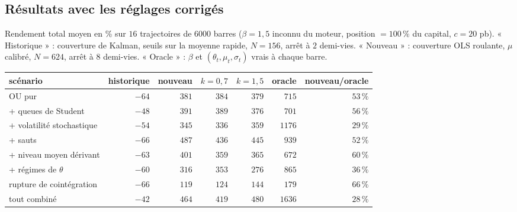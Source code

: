 \documentclass[11pt,a4paper]{article}
\theoremstyle{definition}
\theoremstyle{remark}
\begin{document}
\subsection{Résultats avec les réglages corrigés}

Rendement total moyen en \% sur $16$ trajectoires de $6000$ barres ($\beta=1{,}5$ inconnu du moteur, position $=100\,\%$ du capital, $c=20$ pb).
« Historique » : couverture de Kalman, seuils sur la moyenne rapide, $N=156$, arrêt à $2$ demi-vies. « Nouveau » : couverture OLS roulante, $\mu$ calibré, $N=624$, arrêt à $8$ demi-vies.
« Oracle » : $\beta$ et $(\theta_t,\mu_t,\sigma_t)$ vrais à chaque barre.

\begin{center}
\small
\begin{tabular}{lrrrrrr}
\toprule
scénario & historique & nouveau & $k=0{,}7$ & $k=1{,}5$ & oracle & nouveau/oracle\\
\midrule
OU pur & $-64$ & $381$ & $384$ & $379$ & $715$ & $53\,\%$\\
+ queues de Student & $-48$ & $391$ & $389$ & $376$ & $701$ & $56\,\%$\\
+ volatilité stochastique & $-54$ & $345$ & $336$ & $359$ & $1176$ & $29\,\%$\\
+ sauts & $-66$ & $487$ & $436$ & $445$ & $939$ & $52\,\%$\\
+ niveau moyen dérivant & $-63$ & $401$ & $359$ & $365$ & $672$ & $60\,\%$\\
+ régimes de $\theta$ & $-60$ & $316$ & $353$ & $276$ & $865$ & $36\,\%$\\
rupture de cointégration & $-66$ & $119$ & $124$ & $144$ & $179$ & $66\,\%$\\
tout combiné & $-42$ & $464$ & $419$ & $480$ & $1636$ & $28\,\%$\\
\bottomrule
\end{tabular}
\end{center}
\end{document}
